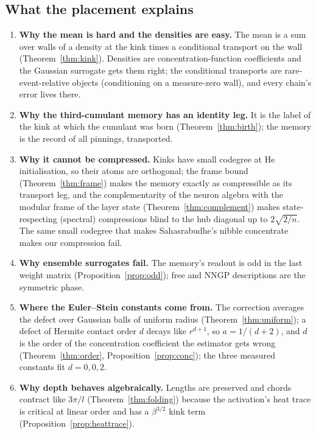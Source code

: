 \label{sec:outlook}
\subsection{What the placement explains}
\begin{enumerate}[leftmargin=*]
\item \textbf{Why the mean is hard and the densities are easy.} The mean is a sum over walls of a density at the kink
times a conditional transport on the wall (Theorem~\ref{thm:kink}). Densities are concentration-function
coefficients and the Gaussian surrogate gets them right; the conditional transports are rare-event-relative objects
(conditioning on a measure-zero wall), and every chain's error lives there.
\item \textbf{Why the third-cumulant memory has an identity leg.} It is the label of the kink at which the cumulant was
born (Theorem~\ref{thm:birth}); the memory is the record of all pinnings, transported.
\item \textbf{Why it cannot be compressed.} Kinks have small codegree at He initialisation, so their atoms are orthogonal;
the frame bound (Theorem~\ref{thm:frame}) makes the memory exactly as compressible as its transport leg, and the
complementarity of the neuron algebra with the modular frame of the layer state (Theorem~\ref{thm:complement}) makes
state-respecting (spectral) compressions blind to the hub diagonal up to $2\sqrt{2/n}$. The same small codegree that
makes Sahasrabudhe's nibble concentrate makes our compression fail.
\item \textbf{Why ensemble surrogates fail.} The memory's readout is odd in the last weight matrix
(Proposition~\ref{prop:odd}); free and NNGP descriptions are the symmetric phase.
\item \textbf{Where the Euler--Stein constants come from.} The correction averages the defect over Gaussian balls of
uniform radius (Theorem~\ref{thm:uniform}); a defect of Hermite contact order $d$ decays like $r^{d+1}$, so
$a=1/(d+2)$, and $d$ is the order of the concentration coefficient the estimator gets wrong
(Theorem~\ref{thm:order}, Proposition~\ref{prop:conc}); the three measured constants fit $d=0,0,2$.
\item \textbf{Why depth behaves algebraically.} Lengths are preserved and chords contract like $3\pi/l$
(Theorem~\ref{thm:folding}) because the activation's heat trace is critical at linear order and has a
$\beta^{3/2}$ kink term (Proposition~\ref{prop:heattrace}).
\end{enumerate}

